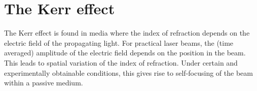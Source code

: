 \chapter{The Kerr effect}
\label{cha:kerr}

The Kerr effect is found in media where the index of refraction 
depends on the electric field of the propagating light. For practical
laser beams, the (time averaged) amplitude of the electric
field depends on the position in the beam.
This leads to spatial variation of the index of refraction. Under
certain and experimentally obtainable conditions, this gives rise to
self-focusing of the beam within a passive medium.





